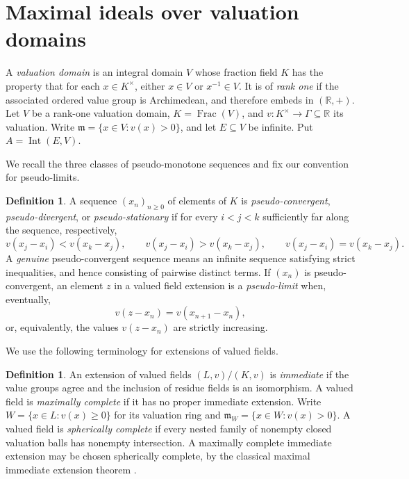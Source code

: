 \documentclass[11pt]{amsart}
\theoremstyle{definition}
\newtheorem{definition}[theorem]{Definition}
\theoremstyle{remark}
\newcommand{\Int}{\operatorname{Int}}
\newcommand{\Frac}{\operatorname{Frac}}
\newcommand{\m}{\mathfrak m}
\begin{document}
\section{Maximal ideals over valuation domains}
A \emph{valuation domain} is an integral domain $V$ whose fraction
field $K$ has the property that for each $x\in K^\times$, either
$x\in V$ or $x^{-1}\in V$. It is of \emph{rank one} if the
associated ordered value group is Archimedean, and therefore embeds
in $(\mathbb R,+)$.
Let $V$ be a rank-one valuation domain, $K=\Frac(V)$, and
$v:K^\times\to\Gamma\subseteq\mathbb R$ its valuation. Write
$\mathfrak m=\{x\in V:v(x)>0\}$, and let $E\subseteq V$ be
infinite. Put $A=\Int(E,V)$.


We recall the three classes of pseudo-monotone sequences and fix our convention for pseudo-limits.
\begin{definition}\label{def:pseudo}
A sequence $(x_n)_{n\geq0}$ of elements of $K$ is \emph{pseudo-convergent}, \emph{pseudo-divergent}, or \emph{pseudo-stationary} if for every $i<j<k$ sufficiently far along the sequence, respectively,
\[
 v(x_j-x_i)<v(x_k-x_j),\qquad
 v(x_j-x_i)>v(x_k-x_j),\qquad
 v(x_j-x_i)=v(x_k-x_j).
\]
A \emph{genuine} pseudo-convergent sequence means an infinite sequence satisfying strict inequalities, and hence consisting of pairwise distinct terms. If $(x_n)$ is pseudo-convergent, an element $z$ in a valued field extension is a \emph{pseudo-limit} when, eventually,
\[
 v(z-x_n)=v(x_{n+1}-x_n),
\]
or, equivalently, the values $v(z-x_n)$ are strictly increasing.
\end{definition}


We use the following terminology for extensions of valued fields.
\begin{definition}
An extension of valued fields $(L,v)/(K,v)$ is \emph{immediate}
if the value groups agree and the inclusion of residue fields is an
isomorphism. A valued field is \emph{maximally complete} if it has
no proper immediate extension. Write $W=\{x\in L:v(x)\geq0\}$ for its valuation ring and $\m_W=\{x\in W:v(x)>0\}$. A valued field is \emph{spherically complete} if every nested family of nonempty closed valuation balls has nonempty intersection. A maximally complete immediate extension may be chosen spherically complete, by the classical maximal immediate extension theorem \cite{Krull1932,Kaplansky1942}.
\end{definition}
\end{document}
